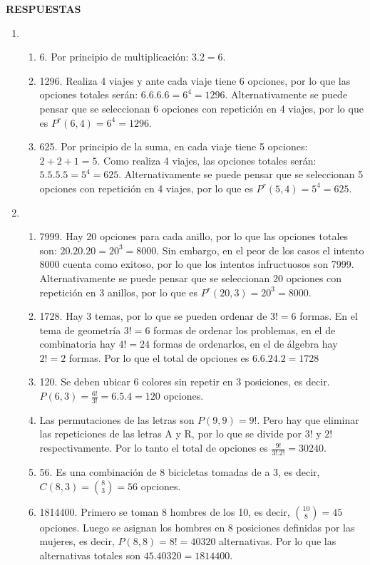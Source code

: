 \documentclass[a4paper]{article}
\newcommand{\exercise}{\item}
\begin{document}
 \textbf{RESPUESTAS}\begin{enumerate}\exercise\begin{enumerate} [label=(\alph*)]		\item 6. Por principio de multiplicación: $3 . 2 = 6$. 
		\item 1296. Realiza 4 viajes y ante cada viaje tiene 6 opciones, por lo que las opciones totales serán: $6.6.6.6 = 6^4 = 1296$. Alternativamente se puede pensar que se seleccionan 6 opciones con repetición en 4 viajes, por lo que es $P^r(6,4)=6^4=1296$.
		\item 625. Por principio de la suma, en cada viaje tiene 5 opciones: $ 2 + 2 + 1 = 5$. Como realiza 4 viajes, las opciones totales serán: $5.5.5.5 = 5^4 = 625$.  Alternativamente se puede pensar que se seleccionan 5 opciones con repetición en 4 viajes, por lo que es $P^r(5,4)=5^4=625$.
\end{enumerate}\exercise\begin{enumerate} [label=(\alph*)]		\item 7999. Hay 20 opciones para cada anillo, por lo que las opciones totales son: $20.20.20 = 20^3 = 8000$. Sin embargo, en el peor de los casos el intento 8000 cuenta como exitoso, por lo que los intentos infructuosos son 7999. Alternativamente se puede pensar que se seleccionan 20 opciones con repetición en 3 anillos, por lo que es $P^r(20,3)=20^3=8000$. 
		\item 1728. Hay 3 temas, por lo que se pueden ordenar de $3! = 6$ formas. En el tema de geometría $3! = 6$ formas de ordenar los problemas, en el de combinatoria hay $4!=24$ formas de ordenarlos, en el de álgebra hay $2!=2$ formas. Por lo que el total de opciones es $6.6.24.2 = 1728$
		\item 120. Se deben ubicar 6 colores sin repetir en 3 posiciones, es decir. $P(6,3)=\frac{6!}{3!}=6.5.4=120$ opciones.
		\item Las permutaciones de las letras son $P(9,9)=9!$. Pero hay que eliminar las repeticiones de las letras A y R, por lo que se divide por $3!$ y $2!$ respectivamente. Por lo tanto el total de opciones es $\frac{9!}{3!.2!}=30240$.
		\item 56. Es una combinación de 8 bicicletas tomadas de a 3, es decir, $C(8,3)=\binom{8}{3}=56$ opciones.
		\item 1814400. Primero se toman 8 hombres de los 10, es decir, $\binom{10}{8}=45$ opciones. Luego se asignan los hombres en 8 posiciones definidas por las mujeres, es decir, $P(8,8)=8!=40320$ alternativas. Por lo que las alternativas totales son $45.40320=1814400$.

\end{enumerate}
\end{enumerate}
\end{document}
